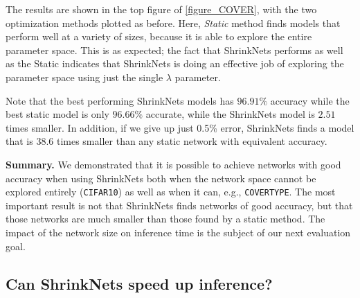The results are shown in the top figure of \cref{figure_COVER}, with the two
optimization methods plotted as before. Here, {\it Static} method finds models
that perform well at a variety of sizes, because it is able to explore the
entire parameter space.  This is as expected;  the fact that ShrinkNets performs
as well as the Static indicates that ShrinkNets is doing an effective job of
exploring the parameter space using just the single $\lambda$ parameter.

Note that the best performing ShrinkNets models has $96.91\%$ accuracy while the
best static model is only $96.66\%$ accurate, while the ShrinkNets model is $2.51$
times smaller. In addition, if we give up just 0.5\% error, ShrinkNets finds a
model that is 38.6 times smaller than any static network with equivalent accuracy.

\noindent\textbf{Summary.} We demonstrated that it is possible to achieve
networks with good accuracy when using ShrinkNets both when the network space
cannot be explored entirely (\texttt{CIFAR10}) as well as when it can, e.g.,
\texttt{COVERTYPE}. The most important result is not that ShrinkNets finds
networks of good accuracy, but that those networks are much smaller than those
found by a static method. The impact of the network size on inference time is
the subject of our next evaluation goal.

%
%
%

\subsection{Can ShrinkNets speed up inference?}


